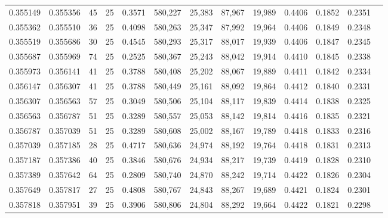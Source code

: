 \begin{tabular}{rrrrrrrrrrrrr}
0.355149 & 0.355356 &    45 &  25 &                                     0.3571 & 580,227 &  25,383 &  87,967 &  19,989 & 0.4406 & 0.1852 & 0.2351 \\
0.355362 & 0.355510 &    36 &  25 &                                     0.4098 & 580,263 &  25,347 &  87,992 &  19,964 & 0.4406 & 0.1849 & 0.2348 \\
0.355519 & 0.355686 &    30 &  25 &                                     0.4545 & 580,293 &  25,317 &  88,017 &  19,939 & 0.4406 & 0.1847 & 0.2345 \\
0.355687 & 0.355969 &    74 &  25 &                                     0.2525 & 580,367 &  25,243 &  88,042 &  19,914 & 0.4410 & 0.1845 & 0.2338 \\
0.355973 & 0.356141 &    41 &  25 &                                     0.3788 & 580,408 &  25,202 &  88,067 &  19,889 & 0.4411 & 0.1842 & 0.2334 \\
0.356147 & 0.356307 &    41 &  25 &                                     0.3788 & 580,449 &  25,161 &  88,092 &  19,864 & 0.4412 & 0.1840 & 0.2331 \\
0.356307 & 0.356563 &    57 &  25 &                                     0.3049 & 580,506 &  25,104 &  88,117 &  19,839 & 0.4414 & 0.1838 & 0.2325 \\
0.356563 & 0.356787 &    51 &  25 &                                     0.3289 & 580,557 &  25,053 &  88,142 &  19,814 & 0.4416 & 0.1835 & 0.2321 \\
0.356787 & 0.357039 &    51 &  25 &                                     0.3289 & 580,608 &  25,002 &  88,167 &  19,789 & 0.4418 & 0.1833 & 0.2316 \\
0.357039 & 0.357185 &    28 &  25 &                                     0.4717 & 580,636 &  24,974 &  88,192 &  19,764 & 0.4418 & 0.1831 & 0.2313 \\
0.357187 & 0.357386 &    40 &  25 &                                     0.3846 & 580,676 &  24,934 &  88,217 &  19,739 & 0.4419 & 0.1828 & 0.2310 \\
0.357389 & 0.357642 &    64 &  25 &                                     0.2809 & 580,740 &  24,870 &  88,242 &  19,714 & 0.4422 & 0.1826 & 0.2304 \\
0.357649 & 0.357817 &    27 &  25 &                                     0.4808 & 580,767 &  24,843 &  88,267 &  19,689 & 0.4421 & 0.1824 & 0.2301 \\
0.357818 & 0.357951 &    39 &  25 &                                     0.3906 & 580,806 &  24,804 &  88,292 &  19,664 & 0.4422 & 0.1821 & 0.2298 \\

\end{tabular}
